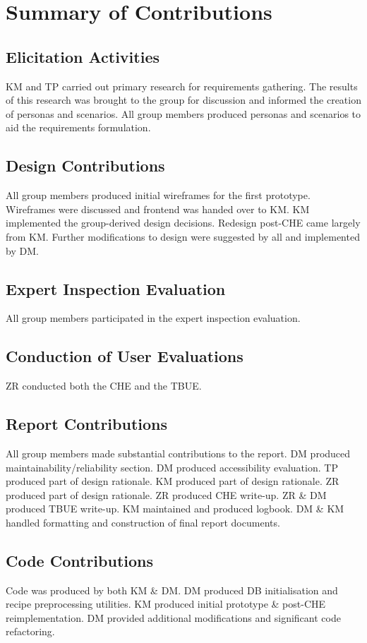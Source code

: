 \documentclass{article}
\begin{document}
\section*{Summary of Contributions}
\subsection*{Elicitation Activities}
KM and TP carried out primary research for requirements gathering.
The results of this research was brought to the group for discussion and informed
the creation of personas and scenarios.
All group members produced personas and scenarios to aid the requirements formulation.
\subsection*{Design Contributions}
All group members produced initial wireframes for the first prototype.
Wireframes were discussed and frontend was handed over to KM.
KM implemented the group-derived design decisions.
Redesign post-CHE came largely from KM.
Further modifications to design were suggested by all and implemented by DM.
\subsection*{Expert Inspection Evaluation}
All group members participated in the expert inspection evaluation.
\subsection*{Conduction of User Evaluations}
ZR conducted both the CHE and the TBUE.
\subsection*{Report Contributions}
All group members made substantial contributions to the report.
DM produced maintainability/reliability section.
DM produced accessibility evaluation.
TP produced part of design rationale.
KM produced part of design rationale.
ZR produced part of design rationale.
ZR produced CHE write-up.
ZR \& DM produced TBUE write-up.
KM maintained and produced logbook.
DM \& KM handled formatting and construction of final report documents.
\subsection*{Code Contributions}
Code was produced by both KM \& DM.
DM produced DB initialisation and recipe preprocessing utilities.
KM produced initial prototype \& post-CHE reimplementation.
DM provided additional modifications and significant code refactoring.
\end{document}
